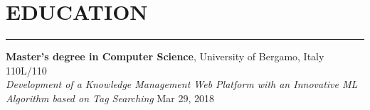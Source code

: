 \documentclass[10pt]{article}
\newcommand{\cvsection}[1]{\section*{\centering\normalsize\uppercase{#1}}\vspace{-16pt}\rule{\linewidth}{0.2pt}\vspace{6pt}}
\begin{document}

\clearpage
\pagestyle{fancy}


\cvsection{education}
\textbf{Master's degree in Computer Science}, University of Bergamo, Italy \hfill 110L\slash110 \\
\textit{Development of a Knowledge Management Web Platform with an Innovative ML Algorithm based on Tag Searching} \hfill Mar 29, 2018
\end{document}
